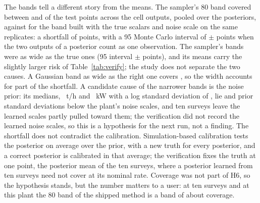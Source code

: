 The bands tell a different story from the means. The sampler's 80\pct{} band covered between \verCovMin{} and \verCovMax{} of
the test points across the cell outputs, \verCovPooled{} pooled over the \verPosteriors{} posteriors, against \verCovTrue{} for
the band built with the true scalars and noise scale on the same replicates: a shortfall of \verCovGap{} points, with a 95\pct{}
Monte Carlo interval of $\pm$\verCovGapCI{} points when the two outputs of a posterior count as one observation. The sampler's
bands were \verWidthPct\pct{} as wide as the true ones (95\pct{} interval $\pm$\verWidthCI{} points), and its means carry the slightly larger risk
of Table~\ref{tab:verify}; the study does not separate the two causes. A Gaussian band \verWidthPct\pct{} as wide as the right
one covers \verWidthOnlyCov, so the width accounts for part of the shortfall. A candidate cause of the narrower bands is the noise
prior: its medians, \noiseMedTph~t/h and \noiseMedKw~kW with a log standard deviation of \noiseLogSd, lie \noiseAboveTph{} and
\noiseAboveKw{} prior standard deviations below the plant's noise scales, and ten surveys leave the learned scales partly pulled
toward them; the verification did not record the
learned noise scales, so this is a hypothesis for the next run, not a finding. The shortfall does not contradict the calibration.
Simulation-based calibration tests the posterior on average over the prior, with a new truth for every posterior, and a correct
posterior is calibrated in that average; the verification fixes the truth at one point, the posterior mean of the ten surveys,
where a posterior learned from ten surveys need not cover at its nominal rate. Coverage was not part of H6, so the hypothesis
stands, but the number matters to a user: at ten surveys and at this plant the 80\pct{} band of the shipped method is a band of
about \verCovPooled{} coverage.
